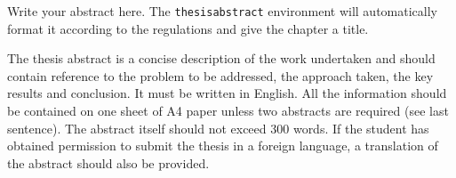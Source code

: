 \begin{thesisabstract}

Write your abstract here. The \texttt{thesisabstract} environment will automatically format it according to the regulations and give the chapter a title. 

The thesis abstract is a concise description of the work 
undertaken and should contain reference to the problem to be 
addressed, the approach taken, the key results and conclusion. It must 
be written in English. All the information 
should be contained on one sheet of A4 paper unless two abstracts are required (see last sentence). The abstract itself should not exceed 300 words. If the student has obtained permission to submit the thesis in a foreign 
language, a translation of the abstract should also be provided.

\end{thesisabstract}
